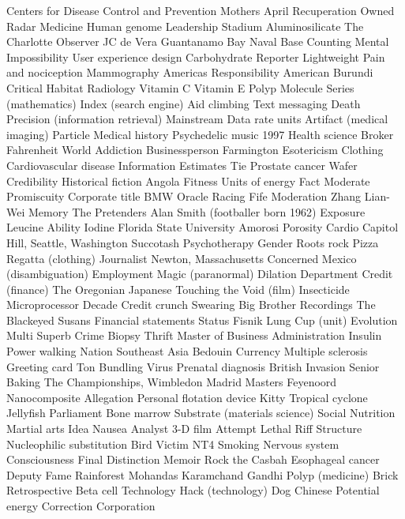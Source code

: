 Centers for Disease Control and Prevention  Mothers  April  
Recuperation  Owned  Radar  
Medicine  Human genome  Leadership  
Stadium  Aluminosilicate  The Charlotte Observer  
JC de Vera  Guantanamo Bay Naval Base  Counting  
Mental  Impossibility  User experience design  
Carbohydrate  Reporter  Lightweight  
Pain and nociception  Mammography  Americas  
Responsibility  American  Burundi  
Critical  Habitat  Radiology  
Vitamin C  Vitamin E  Polyp  
Molecule  Series (mathematics)  Index (search engine)  
Aid climbing  Text messaging  Death  
Precision (information retrieval)  Mainstream  Data rate units  
Artifact (medical imaging)  Particle  Medical history  
Psychedelic music  1997  Health science  
Broker  Fahrenheit  World  
Addiction  Businessperson  Farmington  
Esotericism  Clothing  Cardiovascular disease  
Information  Estimates  Tie  
Prostate cancer  Wafer  Credibility  
Historical fiction  Angola  Fitness  
Units of energy  Fact  Moderate  
Promiscuity  Corporate title  BMW Oracle Racing  
Fife  Moderation  Zhang Lian-Wei  
Memory  The Pretenders  Alan Smith (footballer born 1962)  
Exposure  Leucine  Ability  
Iodine  Florida State University  Amorosi  
Porosity  Cardio  Capitol Hill, Seattle, Washington  
Succotash  Psychotherapy  Gender  
Roots rock  Pizza  Regatta (clothing)  
Journalist  Newton, Massachusetts  Concerned  
Mexico (disambiguation)  Employment  Magic (paranormal)  
Dilation  Department  Credit (finance)  
The Oregonian  Japanese  Touching the Void (film)  
Insecticide  Microprocessor  Decade  
Credit crunch  Swearing  Big Brother Recordings  
The Blackeyed Susans  Financial statements  Status  
Fisnik  Lung  Cup (unit)  
Evolution  Multi  Superb  
Crime  Biopsy  Thrift  
Master of Business Administration  Insulin  Power walking  
Nation  Southeast Asia  Bedouin  
Currency  Multiple sclerosis  Greeting card  
Ton  Bundling  Virus  
Prenatal diagnosis  British Invasion  Senior  
Baking  The Championships, Wimbledon  Madrid Masters  
Feyenoord  Nanocomposite  Allegation  
Personal flotation device  Kitty  Tropical cyclone  
Jellyfish  Parliament  Bone marrow  
Substrate (materials science)  Social  Nutrition  
Martial arts  Idea  Nausea  
Analyst  3-D film  Attempt  
Lethal  Riff  Structure  
Nucleophilic substitution  Bird  Victim  
NT4  Smoking  Nervous system  
Consciousness  Final  Distinction  
Memoir  Rock the Casbah  Esophageal cancer  
Deputy  Fame  Rainforest  
Mohandas Karamchand Gandhi  Polyp (medicine)  Brick  
Retrospective  Beta cell  Technology  
Hack (technology)  Dog  Chinese  
Potential energy  Correction  Corporation  
